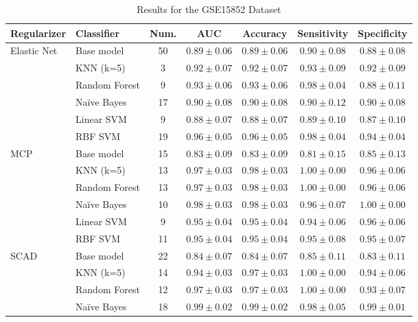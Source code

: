 \documentclass[twoside]{article}
\begin{document}
	\begin{table}[h!]
		\centering
		\caption{Results for the GSE15852 Dataset}
		\label{tab:gse15852_results}
		\small
		\begin{tabular}{|l|l|ccccc|}
			\hline
			Regularizer & Classifier & Num. & AUC & Accuracy & Sensitivity & Specificity \\
			\hline \hline
			{Elastic Net}
			& Base model    & 50 & $0.89 \pm 0.06$ & $0.89 \pm 0.06$ & $0.90 \pm 0.08$ & $0.88 \pm 0.08$ \\
			& KNN (k=5)     & 3  & $0.92 \pm 0.07$ & $0.92 \pm 0.07$ & $0.93 \pm 0.09$ & $0.92 \pm 0.09$ \\
			& Random Forest & 9  & $0.93 \pm 0.06$ & $0.93 \pm 0.06$ & $0.98 \pm 0.04$ & $0.88 \pm 0.11$ \\
			& Naïve Bayes   & 17 & $0.90 \pm 0.08$ & $0.90 \pm 0.08$ & $0.90 \pm 0.12$ & $0.90 \pm 0.08$ \\
			& Linear SVM    & 9  & $0.88 \pm 0.07$ & $0.88 \pm 0.07$ & $0.89 \pm 0.10$ & $0.87 \pm 0.10$ \\
			& RBF SVM       & 19 & $0.96 \pm 0.05$ & $0.96 \pm 0.05$ & $0.98 \pm 0.04$ & $0.94 \pm 0.04$ \\
			\hline
			{MCP}
			& Base model    & 15 & $0.83 \pm 0.09$ & $0.83 \pm 0.09$ & $0.81 \pm 0.15$ & $0.85 \pm 0.13$ \\
			& KNN (k=5)     & 13 & $0.97 \pm 0.03$ & $0.98 \pm 0.03$ & $1.00 \pm 0.00$ & $0.96 \pm 0.06$ \\
			& Random Forest & 13 & $0.97 \pm 0.03$ & $0.98 \pm 0.03$ & $1.00 \pm 0.00$ & $0.96 \pm 0.06$ \\
			& Naïve Bayes   & 10 & $0.98 \pm 0.03$ & $0.98 \pm 0.03$ & $0.96 \pm 0.07$ & $1.00 \pm 0.00$ \\
			& Linear SVM    & 9  & $0.95 \pm 0.04$ & $0.95 \pm 0.04$ & $0.94 \pm 0.06$ & $0.96 \pm 0.06$ \\
			& RBF SVM       & 11 & $0.95 \pm 0.04$ & $0.95 \pm 0.04$ & $0.95 \pm 0.08$ & $0.95 \pm 0.07$ \\
			\hline
		{SCAD}
			& Base model    & 22 & $0.84 \pm 0.07$ & $0.84 \pm 0.07$ & $0.85 \pm 0.11$ & $0.83 \pm 0.11$ \\
			& KNN (k=5)     & 14 & $0.94 \pm 0.03$ & $0.97 \pm 0.03$ & $1.00 \pm 0.00$ & $0.94 \pm 0.06$ \\
			& Random Forest & 12 & $0.97 \pm 0.03$ & $0.97 \pm 0.03$ & $1.00 \pm 0.00$ & $0.93 \pm 0.07$ \\
			& Naïve Bayes   & 18 & $0.99 \pm 0.02$ & $0.99 \pm 0.02$ & $0.98 \pm 0.05$ & $0.99 \pm 0.01$ \\

\end{tabular}
\end{table}
\end{document}
